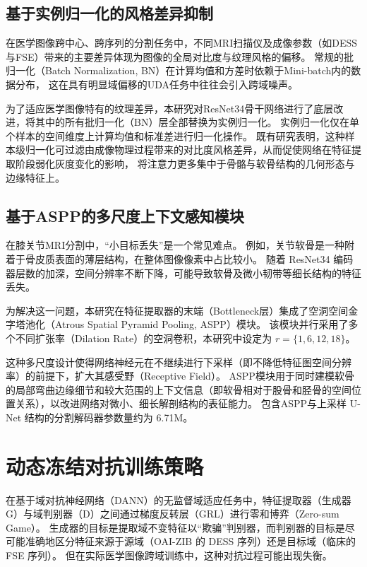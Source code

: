   \subsection{基于实例归一化的风格差异抑制}
    在医学图像跨中心、跨序列的分割任务中，不同MRI扫描仪及成像参数（如DESS与FSE）带来的主要差异体现为图像的全局对比度与纹理风格的偏移。
    常规的批归一化（Batch Normalization, BN）在计算均值和方差时依赖于Mini-batch内的数据分布，
    这在具有明显域偏移的UDA任务中往往会引入跨域噪声。
    \par 为了适应医学图像特有的纹理差异，本研究对ResNet34骨干网络进行了底层改进，将其中的所有批归一化（BN）层全部替换为实例归一化。
    实例归一化仅在单个样本的空间维度上计算均值和标准差进行归一化操作。
    既有研究表明，这种样本级归一化可过滤由成像物理过程带来的对比度风格差异，从而促使网络在特征提取阶段弱化灰度变化的影响，
    将注意力更多集中于骨骼与软骨结构的几何形态与边缘特征上。
  \subsection{基于ASPP的多尺度上下文感知模块}
    在膝关节MRI分割中，“小目标丢失”是一个常见难点。
    例如，关节软骨是一种附着于骨皮质表面的薄层结构，在整体图像像素中占比较小。
    随着 ResNet34 编码器层数的加深，空间分辨率不断下降，可能导致软骨及微小韧带等细长结构的特征丢失。
    \par 为解决这一问题，本研究在特征提取器的末端（Bottleneck层）集成了空洞空间金字塔池化（Atrous Spatial Pyramid Pooling, ASPP）模块。
    该模块并行采用了多个不同扩张率（Dilation Rate）的空洞卷积，本研究中设定为 $r=\{1,6,12,18\}$。
    \par 这种多尺度设计使得网络神经元在不继续进行下采样（即不降低特征图空间分辨率）的前提下，扩大其感受野（Receptive Field）。
    ASPP模块用于同时建模软骨的局部弯曲边缘细节和较大范围的上下文信息（即软骨相对于股骨和胫骨的空间位置关系），以改进网络对微小、细长解剖结构的表征能力。
    包含ASPP与上采样 U-Net 结构的分割解码器参数量约为 6.71M。

\section{动态冻结对抗训练策略}
  在基于域对抗神经网络（DANN）的无监督域适应任务中，特征提取器（生成器 G）与域判别器（D）之间通过梯度反转层（GRL）进行零和博弈（Zero-sum Game）。
  生成器的目标是提取域不变特征以“欺骗”判别器，而判别器的目标是尽可能准确地区分特征来源于源域（OAI-ZIB 的 DESS 序列）还是目标域（临床的 FSE 序列）。
  但在实际医学图像跨域训练中，这种对抗过程可能出现失衡。
